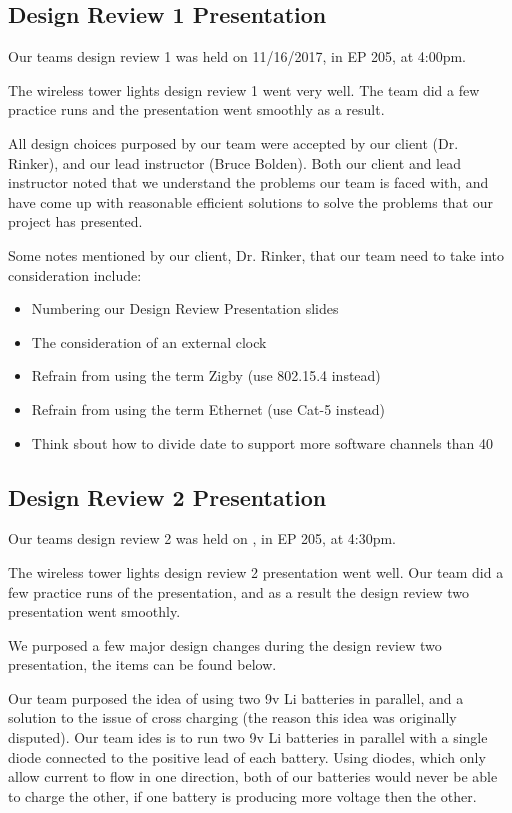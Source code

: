 \documentclass[12pt]{article}
\begin{document}
{{	\subsection{Design Review 1 Presentation}
	Our teams design review 1 was held on 11/16/2017, in EP 205, at 4:00pm.
	
	\noindent
	The wireless tower lights design review 1 went very well. The team did a few 			practice runs and the presentation went smoothly as a result.
	
	\noindent
	All design choices purposed by our team were accepted by our client (Dr. Rinker), 	and our lead instructor (Bruce Bolden). Both our client and lead instructor noted 	that we understand the problems our team is faced with, and have come up with 			reasonable efficient solutions to solve the problems that our project has 				presented.
	
	\noindent
	Some notes mentioned by our client, Dr. Rinker, that our team need to take into 		consideration include:
	\begin{itemize}
	\item Numbering our Design Review Presentation slides
	\item The consideration of an external clock
	\item Refrain from using the term Zigby (use 802.15.4 instead)
	\item Refrain from using the term Ethernet (use Cat-5 instead)
	\item Think sbout how to divide date to support more software channels than 40
	\end{itemize}

	\clearpage
	
	\subsection{Design Review 2 Presentation}
	Our teams design review 2 was held on , in EP 205, at 4:30pm.
	
	\noindent
	The wireless tower lights design review 2 presentation went well. Our team did a 		few practice runs of the presentation, and as a result the design review two 			presentation went smoothly.
	
	\noindent
	We purposed a few major design changes during the design review two presentation, 	the items can be found below.
	
	\noindent
	Our team purposed the idea of using two 9v Li batteries in parallel, and a 				solution to the issue of cross charging (the reason this idea was originally 			disputed). Our team ides is to run two 9v Li batteries in parallel with a single 		diode connected to the positive lead of each battery. Using diodes, which only 			allow current to flow in one direction, both of our batteries would never be able 	to charge the other, if one battery is producing more voltage then the other. 
	
}}
\end{document}
